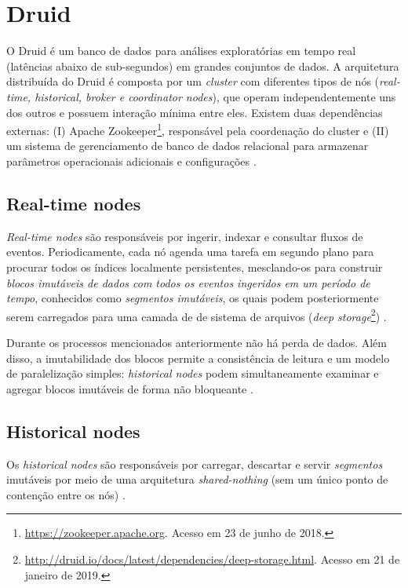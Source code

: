 \documentclass[
	12pt,				%
	oneside,			%
	a4paper,			%
	english,			%
	brazil				%
	]{abntex2ppgsi}
\begin{document}
{{{\section{Druid}
\label{druid}

O Druid é um banco de dados para análises exploratórias em tempo real (latências abaixo de sub-segundos) em grandes conjuntos de dados. A arquitetura distribuída do Druid é composta por um \textit{cluster} com diferentes tipos de nós (\textit{real-time, historical, broker e coordinator nodes}), que operam independentemente uns dos outros e possuem interação mínima entre eles. Existem duas dependências externas: (I) Apache Zookeeper\footnote{\url{https://zookeeper.apache.org}. Acesso em 23 de junho de 2018.}, responsável pela coordenação do cluster e (II) um sistema de gerenciamento de banco de dados relacional  para armazenar parâmetros operacionais adicionais e configurações \cite{yang2014druid}.

\subsection{Real-time nodes}

\textit {Real-time nodes} são responsáveis por ingerir, indexar e consultar fluxos de eventos. Periodicamente, cada nó agenda uma tarefa em segundo plano para procurar todos os índices localmente persistentes, mesclando-os para construir \emph{blocos imutáveis de dados com todos os eventos ingeridos em um período de tempo}, conhecidos como \emph{segmentos imutáveis}, os quais podem posteriormente serem carregados para uma camada de de sistema de arquivos (\textit{deep storage}\footnote{\url{http://druid.io/docs/latest/dependencies/deep-storage.html}. Acesso em 21 de janeiro de 2019.}) \cite{yang2014druid}.

Durante os processos mencionados anteriormente não há perda de dados. Além disso, a imutabilidade dos blocos permite a consistência de leitura e um modelo de paralelização simples: \textit{historical nodes} podem simultaneamente examinar e agregar blocos imutáveis de forma não bloqueante \cite{yang2014druid}.

\subsection{Historical nodes}

Os \textit{historical nodes} são responsáveis por carregar, descartar e servir \emph{segmentos} imutáveis por meio de uma arquitetura \textit{shared-nothing} (sem um único ponto de contenção entre os nós) \cite{yang2014druid}.

}}}
\end{document}
